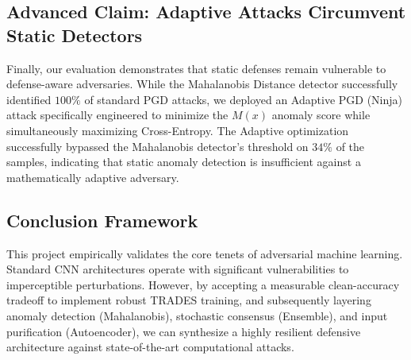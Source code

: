 \documentclass[12pt, a4paper]{article}
\begin{document}
\subsection{Advanced Claim: Adaptive Attacks Circumvent Static Detectors}
Finally, our evaluation demonstrates that static defenses remain vulnerable to defense-aware adversaries. While the Mahalanobis Distance detector successfully identified $100\%$ of standard PGD attacks, we deployed an Adaptive PGD (Ninja) attack specifically engineered to minimize the $M(x)$ anomaly score while simultaneously maximizing Cross-Entropy. The Adaptive optimization successfully bypassed the Mahalanobis detector's threshold on $34\%$ of the samples, indicating that static anomaly detection is insufficient against a mathematically adaptive adversary.

\subsection{Conclusion Framework}
This project empirically validates the core tenets of adversarial machine learning. Standard CNN architectures operate with significant vulnerabilities to imperceptible perturbations. However, by accepting a measurable clean-accuracy tradeoff to implement robust TRADES training, and subsequently layering anomaly detection (Mahalanobis), stochastic consensus (Ensemble), and input purification (Autoencoder), we can synthesize a highly resilient defensive architecture against state-of-the-art computational attacks.
\end{document}
